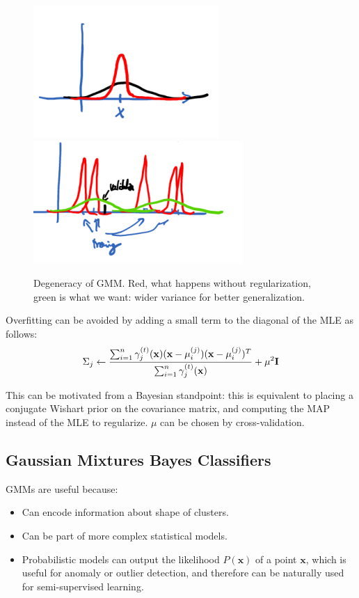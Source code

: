 \documentclass[a4paper,10pt,twoside]{article}
\begin{document}
\begin{figure}
  \centering
  \includegraphics[width=.3\textwidth]{figures/degeneracy_gmm_1.png}
  \includegraphics[width=.3\textwidth]{figures/degeneracy_gmm_2.png}
  \caption{Degeneracy of GMM. Red, what happens without regularization, green is what we want: wider variance for better generalization.}
\label{fig:degeneracy_gmm}
\end{figure}

Overfitting can be avoided by adding a small term to the diagonal of the MLE as follows:
\begin{equation*}
  \Sigma_j\leftarrow {\sum_{i=1}^{n}\gamma_j^{(t)}(\mathbf{x})(\mathbf{x}-\mu_i^{(j)})(\mathbf{x}-\mu_i^{(j)})^T\over\sum_{i=1}^{n}\gamma_j^{(t)}(\mathbf{x})}+\mu^2\mathbf{I}
\end{equation*}

This can be motivated from a Bayesian standpoint: this is equivalent to placing a conjugate Wishart prior on the covariance matrix, and computing the MAP instead of the MLE to regularize. $\mu$ can be chosen by cross-validation.

\subsection{Gaussian Mixtures Bayes Classifiers}

GMMs are useful because:
\begin{itemize}
\item Can encode information about shape of clusters.
\item Can be part of more complex statistical models.
 \item Probabilistic models can output the likelihood $P(\mathbf{x})$ of a point $\mathbf{x}$, which is useful for anomaly or outlier detection, and therefore can
   be naturally used for semi-supervised learning.
 \end{itemize}
\end{document}
